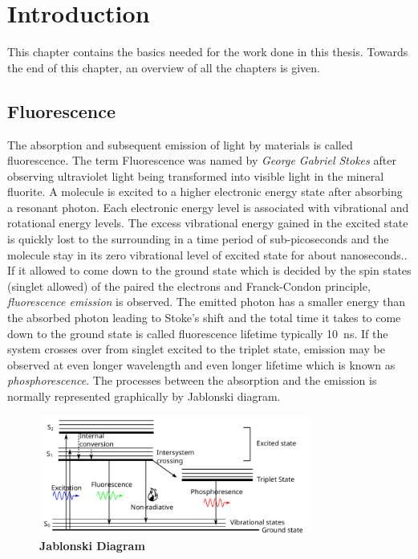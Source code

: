 \chapter{Introduction}
\label{chapter:intro}
\graphicspath{{./chapters/c1_intro/figures/}}
This chapter contains the basics needed for the work done in this thesis.
Towards the end of this chapter, an overview of all the chapters is given.
\section{Fluorescence}
The absorption and subsequent emission of light by materials is called fluorescence.
The term Fluorescence was named by \textit{George Gabriel Stokes} after observing ultraviolet light being transformed into visible light in the mineral fluorite.\cite{Stokes1852}
A molecule is excited to a higher electronic energy state after absorbing a resonant photon.
Each electronic energy level is associated with vibrational and rotational energy levels.
The excess vibrational energy gained in the excited state is quickly lost to the surrounding in a time period of sub-picoseconds and the molecule stay in its zero vibrational level of excited state for about nanoseconds..
If it allowed to come down to the ground state which is decided by the spin states (singlet allowed) of the paired the electrons and Franck-Condon principle, \textit{fluorescence emission} is observed.
The emitted photon has a smaller energy than the absorbed photon leading to Stoke's shift and the total time it takes to come down to the ground state is called fluorescence lifetime typically \SI{10}{\ns}.
If the system crosses over from singlet excited to the triplet state, emission may be observed at even longer wavelength and even longer lifetime which is known as \textit{phosphorescence}.
The processes between the absorption and the emission is normally represented graphically by Jablonski diagram.
\begin{figure}
	\centering
	\includegraphics[width=0.8\textwidth]{jablonski}
	\caption{\textbf{Jablonski Diagram}}
	\label{fig:jablonski}
\end{figure}

